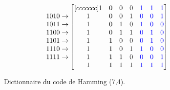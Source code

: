 \documentclass [a4paper, 11pt] {article}
\begin{document}
\begin{figure}[H]
\begin{equation*}
\begin{matrix}
               1010 \rightarrow \\
               1011 \rightarrow \\
               1100 \rightarrow \\
               1101 \rightarrow \\
               1110 \rightarrow \\
               1111 \rightarrow \\
            \end{matrix}
            \begin{bmatrix}[ccccccc]
               1 & 0 & 0 & 0 & \color{blue} 1 & \color{blue} 1 & \color{blue} 1 \\
               1 & 0 & 0 & 1 & \color{blue} 0 & \color{blue} 0 & \color{blue} 1 \\
               1 & 0 & 1 & 0 & \color{blue} 1 & \color{blue} 0 & \color{blue} 0 \\
               1 & 0 & 1 & 1 & \color{blue} 0 & \color{blue} 1 & \color{blue} 0 \\
               1 & 1 & 0 & 0 & \color{blue} 0 & \color{blue} 1 & \color{blue} 0 \\
               1 & 1 & 0 & 1 & \color{blue} 1 & \color{blue} 0 & \color{blue} 0 \\
               1 & 1 & 1 & 0 & \color{blue} 0 & \color{blue} 0 & \color{blue} 1 \\
               1 & 1 & 1 & 1 & \color{blue} 1 & \color{blue} 1 & \color{blue} 1 \\
            \end{bmatrix}
        \end{equation*}
        \caption{Dictionnaire du code de Hamming (7,4).}
        \label{fig:encodage_hamming_7_4}
    \end{figure}
    
\end{document}
